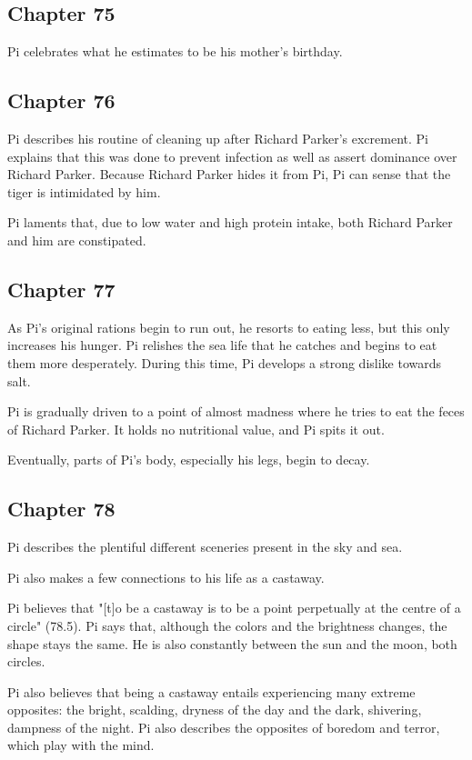 \documentclass[11pt]{article}
\begin{document}
\subsection{Chapter 75}
\label{sec:org0846827}
Pi celebrates what he estimates to be his mother's birthday.
\subsection{Chapter 76}
\label{sec:orge03ee88}
Pi describes his routine of cleaning up after Richard Parker's excrement. Pi explains that this was done to prevent infection as well as assert dominance over Richard Parker. Because Richard Parker hides it from Pi, Pi can sense that the tiger is intimidated by him.

Pi laments that, due to low water and high protein intake, both Richard Parker and him are constipated.
\subsection{Chapter 77}
\label{sec:orgd6db06d}
As Pi's original rations begin to run out, he resorts to eating less, but this only increases his hunger. Pi relishes the sea life that he catches and begins to eat them more desperately. During this time, Pi develops a strong dislike towards salt.

Pi is gradually driven to a point of almost madness where he tries to eat the feces of Richard Parker. It holds no nutritional value, and Pi spits it out.

Eventually, parts of Pi's body, especially his legs, begin to decay.
\subsection{Chapter 78}
\label{sec:orgedcc0b8}
Pi describes the plentiful different sceneries present in the sky and sea.

Pi also makes a few connections to his life as a castaway.

Pi believes that "[t]o be a castaway is to be a point perpetually at the centre of a circle" (78.5). Pi says that, although the colors and the brightness changes, the shape stays the same. He is also constantly between the sun and the moon, both circles.

Pi also believes that being a castaway entails experiencing many extreme opposites: the bright, scalding, dryness of the day and the dark, shivering, dampness of the night. Pi also describes the opposites of boredom and terror, which play with the mind.
\end{document}
